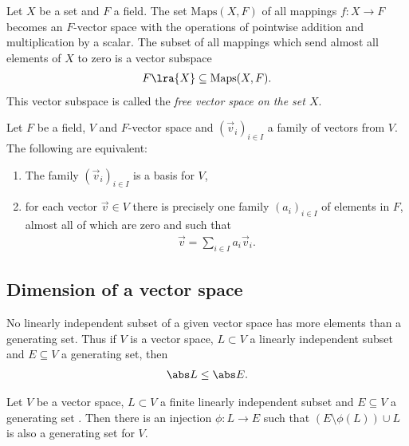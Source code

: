 \documentclass{article}
\begin{document}
\begin{definition}
    Let $X$ be a set and $F$ a field. The set $\text{Maps}(X,F)$ of all mappings
    $f:X\to F$ becomes an $F$-vector space with the operations of pointwise
    addition and multiplication by a scalar. The subset of all mappings which send
    almost all elements of $X$ to zero is a vector subspace
    \begin{align*}
        F\lra{X}\subseteq \text{Maps}(X,F).
    \end{align*}
    This vector subspace is called the \emph{free vector space on the set $X$}.
\end{definition}

\begin{theorem}[Notes 1.5.16]
    Let $F$ be a field, $V$ and $F$-vector space and $(\vec v_i)_{i\in I}$ a
    family of vectors from $V$. The following are equivalent:
    \begin{enumerate}
        \item The family $(\vec v_i)_{i\in I}$ is a basis for $V$,
        \item for each vector $\vec v\in V$ there is precisely one family $(a_i)_{i\in I}$
              of elements in $F$, almost all of which are zero and such that \begin{align*}
                  \vec v = \sum_{i\in I}a_i\vec v_i.
              \end{align*}
    \end{enumerate}
\end{theorem}

\subsection{Dimension of a vector space}

\begin{theorem}
    No linearly independent subset of a given vector space has more elements than
    a generating set. Thus if $V$ is a vector space, $L\subset V$ a linearly independent
    subset and $E\subseteq V$ a generating set, then \begin{align*}
        \abs L \leq \abs E.
    \end{align*}
\end{theorem}

\begin{theorem}
    Let $V$ be a vector space, $L\subset V$ a finite linearly independent subset
    and $E\subseteq V$ a generating set . Then there is an injection $\phi:L\to E$
    such that $(E\setminus\phi(L))\cup L$ is also a generating set for $V$.
\end{theorem}
\end{document}
